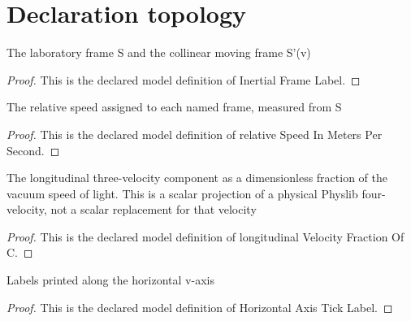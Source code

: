 \section{Declaration topology}
\begin{definition}
  \label{def:physics:phyx-mini-0597:phyxminiproblems-problemphyxmini0597-inertialframelabel}
  The laboratory frame S and the collinear moving frame S'(v)
\end{definition}
\begin{proof}
  This is the declared model definition of Inertial Frame Label.
\end{proof}
\begin{definition}
  \label{def:physics:phyx-mini-0597:phyxminiproblems-problemphyxmini0597-relativespeedinmeterspersecond}
  The relative speed assigned to each named frame, measured from S
\end{definition}
\begin{proof}
  This is the declared model definition of relative Speed In Meters Per Second.
\end{proof}
\begin{definition}
  \label{def:physics:phyx-mini-0597:phyxminiproblems-problemphyxmini0597-longitudinalvelocityfractionofc}
  The longitudinal three-velocity component as a dimensionless fraction of the vacuum speed of light. This is a scalar projection of a physical Physlib four-velocity, not a scalar replacement for that velocity
\end{definition}
\begin{proof}
  This is the declared model definition of longitudinal Velocity Fraction Of C.
\end{proof}
\begin{definition}
  \label{def:physics:phyx-mini-0597:phyxminiproblems-problemphyxmini0597-horizontalaxisticklabel}
  Labels printed along the horizontal v-axis
\end{definition}
\begin{proof}
  This is the declared model definition of Horizontal Axis Tick Label.
\end{proof}
